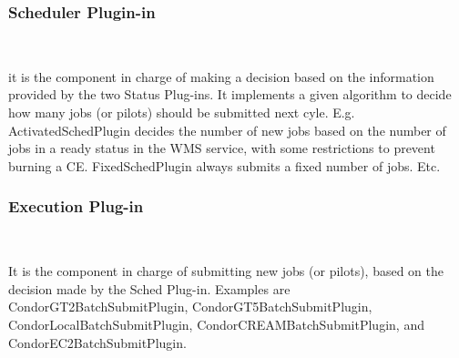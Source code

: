 \documentclass[a4paper]{jpconf}
\begin{document}
\subsubsection{Scheduler Plugin-in}

~

\noindent it is the component in charge of making a decision based on the information provided by the two Status Plug-ins. 
It implements a given algorithm to decide how many jobs (or pilots) should be submitted next cyle. 
E.g. ActivatedSchedPlugin decides the number of new jobs based on the number of jobs in a ready status in the WMS service, 
with some restrictions to prevent burning a CE. 
FixedSchedPlugin always submits a fixed number of jobs. Etc.

\subsubsection{Execution Plug-in}

~

\noindent It is the component in charge of submitting new jobs (or pilots), 
based on the decision made by the Sched Plug-in. 
Examples are CondorGT2BatchSubmitPlugin, CondorGT5BatchSubmitPlugin, CondorLocalBatchSubmitPlugin, CondorCREAMBatchSubmitPlugin, 
and CondorEC2BatchSubmitPlugin.








\end{document}
